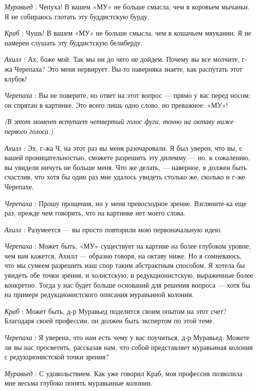 \documentclass[../main.tex]{subfiles}
\begin{document}
\begin{dialogue}
\emph{Муравьед} : Чепуха! В вашем «МУ» не больше смысла, чем в коровьем мычаньи. Я не собираюсь глотать эту буддистскую бурду.

\emph{Краб} : Чушь! В вашем «МУ» не больше смысла, чем в кошачьем мяукании. Я не намерен слушать эту буддистскую белиберду.

\emph{Ахилл} : Ах, боже мой. Так мы ни до чего не дойдем. Почему вы все молчите, г-жа Черепаха? Это меня нервирует. Вы-то наверняка знаете, как распутать этот клубок!

\emph{Черепаха} : Вы не поверите, но ответ на этот вопрос --- прямо у вас перед носом: он спрятан в картинке. Это всего лишь одно слово, но преважное: «МУ»!

\emph{(В этот момент вступает четвертый голос фуги, точно на октаву ниже первого голоса.)}

\emph{Ахилл} : Эх, г-жа Ч, на этот раз вы меня разочаровали. Я был уверен, что вы, с вашей проницательностью, сможете разрешить эту дилемму --- но, к сожалению, вы увидели ничуть не больше меня. Что же делать, --- наверное, я должен быть счастлив, что хотя бы один раз мне удалось увидеть столько же, сколько и г-же Черепахе.

\emph{Черепаха} : Прошу прощения, но у меня превосходное зрение. Взгляните-ка еще раз, прежде чем говорить, что на картинке нет моего слова.

\emph{Ахилл} : Разумеется --- вы просто повторили мою первоначальную идею.

\emph{Черепаха} : Может быть, «МУ» существует на картине на более глубоком уровне, чем вам кажется, Ахилл --- образно говоря, на октаву ниже. Но я сомневаюсь, что мы сумеем разрешить наш спор таким абстрактным способом. Я хотела бы увидеть обе точки зрения, и холистскую, и редукционистскую, выраженные более конкретно. Тогда у нас будет больше оснований для решения вопроса --- хотя бы на примере редукционистского описания муравьиной колонии.

\emph{Краб} : Может быть, д-р Муравьед поделится своим опытом на этот счет? Благодаря своей профессии, он должен быть экспертом по этой теме.

\emph{Черепаха} : Я уверена, что нам есть чему у вас поучиться, д-р Муравьед. Можете ли вы нас просветить, рассказав нам, что собой представляет муравьиная колония с редукционистской точки зрения?

\emph{Муравьед} : С удовольствием. Как уже говорил Краб, моя профессия позволила мне весьма глубоко понять муравьиные колонии.


\end{dialogue}
\end{document}
